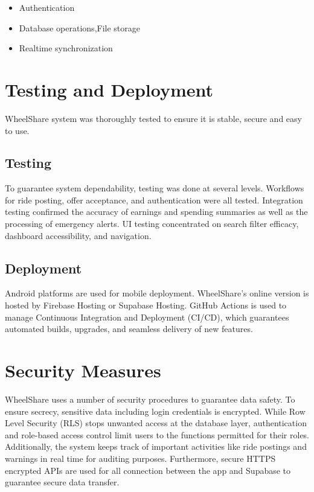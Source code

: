 \begin{itemize}
    \item Authentication
    \item Database operations,File storage
    \item Realtime synchronization
\end{itemize}

\section{Testing and Deployment}
WheelShare system was thoroughly tested to ensure it is stable, secure and easy to use.

\subsection{Testing}
To guarantee system dependability, testing was done at several levels. Workflows for ride posting, offer acceptance, and authentication were all tested. Integration testing confirmed the accuracy of earnings and spending summaries as well as the processing of emergency alerts. UI testing concentrated on search filter efficacy, dashboard accessibility, and navigation. 

\subsection{Deployment}
Android platforms are used for mobile deployment. WheelShare's online version is hosted by Firebase Hosting or Supabase Hosting. GitHub Actions is used to manage Continuous Integration and Deployment (CI/CD), which guarantees automated builds, upgrades, and seamless delivery of new features.

\section{Security Measures}
WheelShare uses a number of security procedures to guarantee data safety. To ensure secrecy, sensitive data including login credentials is encrypted. While Row Level Security (RLS) stops unwanted access at the database layer, authentication and role-based access control limit users to the functions permitted for their roles. Additionally, the system keeps track of important activities like ride postings and warnings in real time for auditing purposes. Furthermore, secure HTTPS encrypted APIs are used for all connection between the app and Supabase to guarantee secure data transfer.



